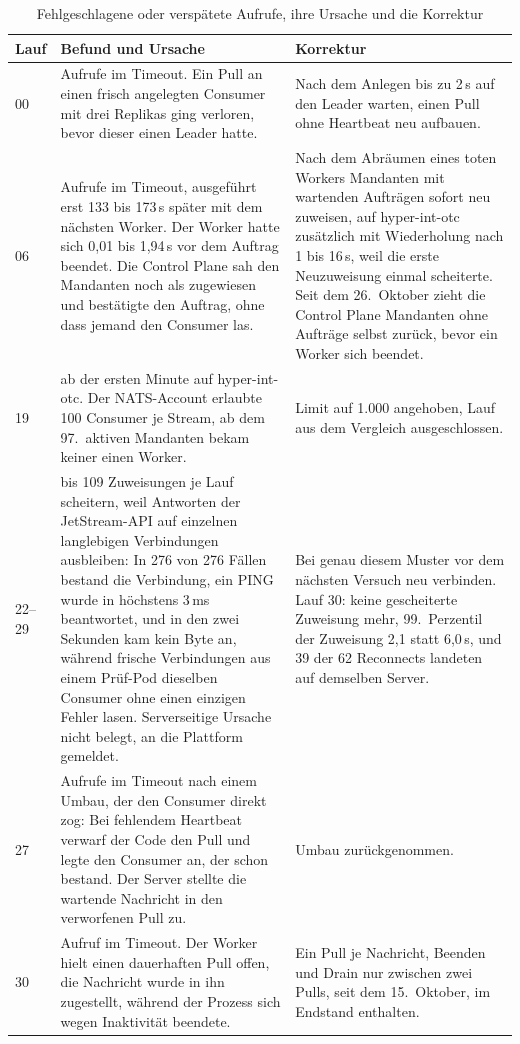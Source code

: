 \begin{table}[H]
  \caption{Fehlgeschlagene oder verspätete Aufrufe, ihre Ursache und die Korrektur}
  \label{tab:zustellung}
  \footnotesize
  \begin{tabularx}{\textwidth}{@{}l >{\RaggedRight\arraybackslash}X >{\RaggedRight\arraybackslash}X@{}}
    \hline
    Lauf & Befund und Ursache & Korrektur \\
    \hline
    00 & 5 Aufrufe im Timeout. Ein Pull an einen frisch angelegten Consumer mit drei Replikas
      ging verloren, bevor dieser einen Leader hatte. & Nach dem Anlegen bis zu 2\,s auf den Leader
      warten, einen Pull ohne Heartbeat neu aufbauen. \\
    06 & 12 Aufrufe im Timeout, ausgeführt erst 133 bis 173\,s später mit dem nächsten Worker.
      Der Worker hatte sich 0,01 bis 1,94\,s vor dem Auftrag beendet. Die Control Plane sah den
      Mandanten noch als zugewiesen und bestätigte den Auftrag, ohne dass jemand den Consumer las. & Nach dem Abräumen eines toten Workers Mandanten mit wartenden
      Aufträgen sofort neu zuweisen, auf hyper-int-otc zusätzlich mit Wiederholung nach 1 bis
      16\,s, weil die erste Neuzuweisung einmal scheiterte. Seit dem 26.\ Oktober zieht die Control
      Plane Mandanten ohne Aufträge selbst zurück, bevor ein Worker sich beendet. \\
    19 & 504 ab der ersten Minute auf hyper-int-otc. Der NATS-Account erlaubte 100 Consumer je
      Stream, ab dem 97.\ aktiven Mandanten bekam keiner einen Worker. & Limit auf 1.000
      angehoben, Lauf aus dem Vergleich ausgeschlossen. \\
    22--29 & 50 bis 109 Zuweisungen je Lauf scheitern, weil Antworten der JetStream-\acs{API} auf
      einzelnen langlebigen Verbindungen ausbleiben: In 276 von 276 Fällen bestand die Verbindung, ein PING wurde in höchstens 3\,ms beantwortet, und in den zwei Sekunden kam kein
      Byte an, während frische Verbindungen aus einem Prüf-Pod dieselben Consumer ohne einen
      einzigen Fehler lasen. Serverseitige Ursache nicht belegt, an die Plattform gemeldet. &
      Bei genau diesem Muster vor dem nächsten Versuch neu verbinden. Lauf 30: keine
      gescheiterte Zuweisung mehr, 99.\ Perzentil der Zuweisung 2,1 statt 6,0\,s, und 39 der 62
      Reconnects landeten auf demselben Server. \\
    27 & 81 Aufrufe im Timeout nach einem Umbau, der den Consumer direkt zog: Bei fehlendem
      Heartbeat verwarf der Code den Pull und legte den Consumer an, der schon bestand. Der Server
      stellte die wartende Nachricht in den verworfenen Pull zu. & Umbau zurückgenommen. \\
    30 & 1 Aufruf im Timeout. Der Worker hielt einen dauerhaften Pull offen, die Nachricht wurde
      in ihn zugestellt, während der Prozess sich wegen Inaktivität beendete. & Ein Pull je
      Nachricht, Beenden und Drain nur zwischen zwei Pulls, seit dem 15.\ Oktober, im Endstand enthalten. \\
    \hline
  \end{tabularx}
\end{table}


